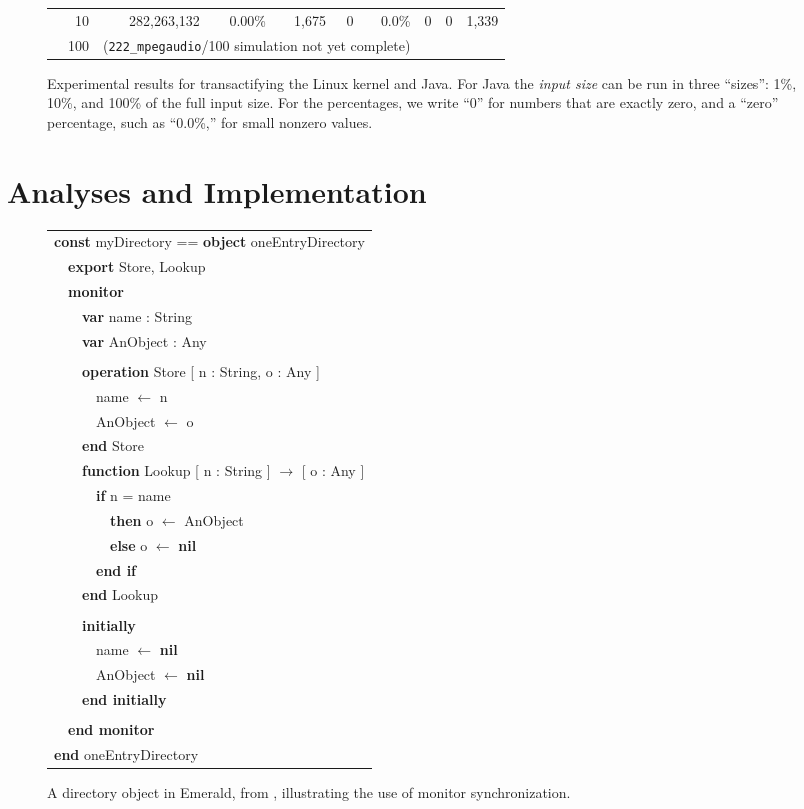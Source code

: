 \documentclass[preprint]{rdbacmconf}
\begin{document}
\begin{figure*}
\begin{center}
\begin{tabular}{l@{}rrrrrrrrr}
                                &  10 & 282,263,132 &  0.00\% &      1,675 &   0 &  0.0\% &     0   &      0   &     1,339 \\
                                & 100 & \multicolumn{5}{c}{(\texttt{222\_mpegaudio}/100 simulation not yet complete)} \\
\end{tabular}
\end{center}
\caption{Experimental results for transactifying the Linux kernel and
Java.  For Java the \textit{input size} can be run in three ``sizes'':
1\%, 10\%, and 100\% of the full input size.    For the percentages,
we write ``0'' for numbers that are exactly zero, and a ``zero''
percentage, such as ``0.0\%,'' for small nonzero values.}
\label{fig:perfnums}
\end{figure*}

\section{Analyses and Implementation}

\begin{figure}[t]
{\it
\begin{tabular}{l}
{\bf const} myDirectory == {\bf object} oneEntryDirectory\\
~~{\bf export} Store, Lookup\\
~~{\bf monitor}\\
~~~~{\bf var} name : String\\
~~~~{\bf var} AnObject : Any\\
\\
~~~~{\bf operation} Store [ n : String, o : Any ]\\
~~~~~~name $\gets$ n\\
~~~~~~AnObject $\gets$ o\\
~~~~{\bf end} Store
\\
~~~~{\bf function} Lookup [ n : String ] $\to$ [ o : Any ]\\
~~~~~~{\bf if} n = name\\
~~~~~~~~{\bf then} o $\gets$ AnObject\\
~~~~~~~~{\bf else} o $\gets$ {\bf nil}\\
~~~~~~{\bf end if}\\
~~~~{\bf end} Lookup\\
\\
~~~~{\bf initially}\\
~~~~~~name $\gets$ {\bf nil}\\
~~~~~~AnObject $\gets$ {\bf nil}\\
~~~~{\bf end initially}\\
\\
~~{\bf end monitor}\\
{\bf end} oneEntryDirectory
\end{tabular}
}
\caption{A directory object in Emerald, from \cite{BlackHuJuLe86},
  illustrating the use of monitor synchronization.}
\label{fig:emerald-dir}
\end{figure}
\end{document}
